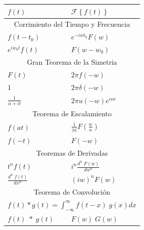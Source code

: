 \documentclass[12pt, fleqn]{report}                             %
\newcommand{\FourierT}[1]{\mathscr{F} \left\{ #1 \right\} }     %
\begin{document}
            \begin{table}[ht]
                \begin{tabular}{|m{16em}|m{16em}|@{}m{0pt}@{}}
                    \hline
                    \large{$f(t)$}          & \large{$\FourierT{f(t)}$}         &\\[2em]    \hline\hline

                    \multicolumn{3}{|c|}{Corrimiento del Tiempo y Frecuencia}   \\          \hline
                    $f(t - t_0)       $     & $e^{-iwt_0} F(w)       $          &\\[1em]    \hline
                    $e^{iw_0t} f(t)   $     & $F(w - w_0)            $          &\\[1em]    \hline\hline

                    \multicolumn{3}{|c|}{Gran Teorema de la Simetria}          \\           \hline
                    $F(t)             $     & $2\pi f(-w)             $        &\\[1em]     \hline
                    $1                $     & $2\pi \delta(-w)        $        &\\[1em]     \hline
                    $\frac{1}{\alpha + it}$ & $2\pi u(-w) e^{\alpha w}$        &\\[1em]     \hline\hline

                    \multicolumn{3}{|c|}{Teorema de Escalamiento}               \\          \hline
                    $f(at)            $     & $\frac{1}{|a|} F(\frac{w}{a})$   &\\[1em]     \hline
                    $f(-t)            $     & $F(-w)$                          &\\[1em]     \hline\hline

                    \multicolumn{3}{|c|}{Teoremas de Derivadas}                 \\          \hline
                    $t^n f(t)               $ & $i^n \frac{d^n \; F(w)}{dw^n}$ &\\[1em]     \hline
                    $\frac{d^n \;f(t)}{dx^n}$ & $(iw)^n F(w)$                  &\\[1em]     \hline\hline

                    \multicolumn{3}{|c|}{Teorema de Convolución}                \\          \hline
                    \multicolumn{3}{|c|}{
                        $f(t) * g(t) = \int_{-\infty}^\infty f(t-x) \; g(x) dx$}\\          \hline
                    $f(t) \; * \; g(t)       $ & $F(w) \; G(w)$                &\\[1em]     \hline
                \end{tabular}
            \end{table}
\end{document}
